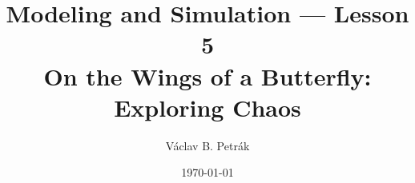 \documentclass[11pt]{beamer}
\title{
Modeling and Simulation --- Lesson 5\\
\textbf{On the Wings of a Butterfly: Exploring Chaos}}
\author{Václav B. Petrák}
\institute{Faculty of Biomedical Engineering\\
Czech Technical University}
\date{\today}
\begin{document}
\begin{frame}
  \titlepage
\end{frame}




\end{document}
